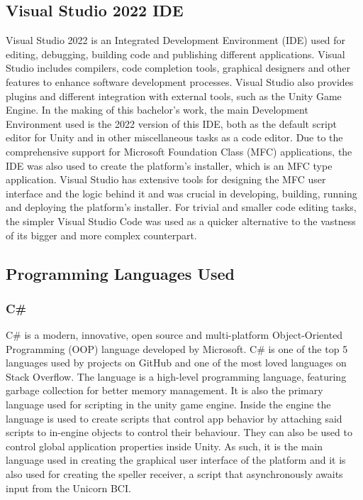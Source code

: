 \subsection{Visual Studio 2022 IDE}
Visual Studio 2022 is an Integrated Development Environment (IDE) used for editing, debugging, building code and publishing different applications. Visual Studio includes compilers, code completion tools, graphical designers and other features to enhance software development processes\cite{VisualStudio}. Visual Studio also provides plugins and different integration with external tools, such as the Unity Game Engine. In the making of this bachelor's work, the main Development Environment used is the 2022 version of this IDE, both as the default script editor for Unity and in other miscellaneous tasks as a code editor.
\vspace{\baselineskip}\newline
Due to the comprehensive support for Microsoft Foundation Class (MFC) applications, the IDE was also used to create the platform's installer, which is an MFC type application. Visual Studio has extensive tools for designing the MFC user interface and the logic behind it and was crucial in developing, building, running and deploying the platform's installer.
\vspace{\baselineskip}\newline
For trivial and smaller code editing tasks, the simpler Visual Studio Code was used as a quicker alternative to the vastness of its bigger and more complex counterpart.
\vspace{\baselineskip}\newline


\subsection{Programming Languages Used}
\subsubsection{C\#}
C\# is a modern, innovative, open source and multi-platform Object-Oriented Programming (OOP) language\cite{C_sharp} developed by Microsoft. C\# is one of the top 5 languages used by projects on GitHub and one of the most loved languages on Stack Overflow\cite{StackOverflow_language_survey}. The language is a high-level programming language, featuring garbage collection for better memory management. It is also the primary language used for scripting in the unity game engine. Inside the engine the language is used to create scripts that control app behavior by attaching said scripts to in-engine objects to control their behaviour. They can also be used to control global application properties inside Unity. As such, it is the main language used in creating the graphical user interface of the platform and it is also used for creating the speller receiver, a script that asynchronously awaits input from the Unicorn BCI.

